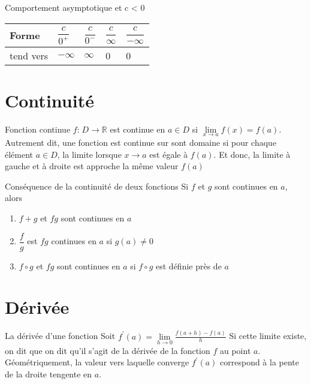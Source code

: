 \documentclass{report}
\newcommand{\varitem}[3][black]{%
    \item[%
        \colorbox{#2}{\textcolor{#1}{\makebox(5.5,7){#3}}}%
    ]
}
\begin{document}
\begin{multicols*}{3}
\begin{Concept}{Comportement asymptotique et c < 0}{}
\end{Concept}
  \begin{table}[h]
    \begin{center}
      \renewcommand{\arraystretch}{1.5}
      \selectfont
      \footnotesize
      \begin{tabular}{|l|l|l|l|l|}
      \arrayrulecolor{blue}\hline
      \rowcolor{lightBlue}
      \textcolor{myb}{Forme} & \textcolor{myb}{$\dfrac{c}{0^{+}}$} & \textcolor{myb}{$\dfrac{c}{0^{-}}$}
                             & \textcolor{myb}{$\dfrac{c}{\infty}$} & \textcolor{myb}{$\dfrac{c}{-\infty}$}
      \\
      \hline
      \hline
      \arrayrulecolor{black}
      tend vers & $-\infty$ & $\infty$ & 0 & 0 
      \\
      \hline
      

  \end{tabular}
  \end{center}
  \end{table}
\section{Continuité}
\begin{Concept}{Fonction continue}{}
  $f\text{:} \; D \rightarrow \mathbb{R}$ est \textcolor{myb}{continue}   en $a \in D$ si $\lim\limits_{x\to a} f(x) = f(a)$. 
  Autrement dit, une fonction est continue sur sont domaine si pour chaque élément $a \in D$, la limite 
  lorsque $x \rightarrow a$ est égale à $f(a)$. Et donc, la limite à gauche et à droite est approche 
  la même valeur $f(a)$
\end{Concept}

\begin{Identite}{Conséquence de la continuité de deux fonctions}{}
    Si $f$ et $g$ sont continues en $a$, alors 
    \begin{enumerate}
      \varitem{blue!40}{\textbf{1.}} $f+g$ et $fg$ sont continues en $a$ 
      \varitem{blue!40}{\textbf{2.}} $\dfrac{f}{g}$ est $fg$ continues en $a$ si $g(a) \neq 0$
      \varitem{blue!40}{\textbf{3.}} $f \circ g$ et $fg$ sont continues en $a$ si $f \circ g$ 
      est définie près de $a$
    \end{enumerate}
\end{Identite}
\columnbreak

\section{Dérivée}
\begin{Definitionx*}{La dérivée d'une fonction}{}
  Soit $f^{\prime}(a) = \lim\limits_{h\to 0}\frac{f(a + h) - f(a)}{h} $ Si cette limite existe, on dit que 
  on dit qu'il s'agit de \textcolor{myb}{la dérivée de la fonction}   $f$ au point $a$. Géométriquement, 
  la valeur vers laquelle converge $f^{\prime}(a)$ correspond à la pente de la droite tengente en $a$.
\end{Definitionx*}


\end{multicols*}
\end{document}
